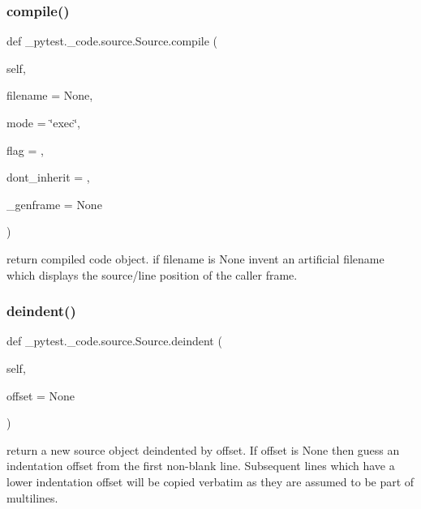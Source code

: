 \subsubsection{\texorpdfstring{compile()}{compile()}}
{\footnotesize\ttfamily def \+\_\+pytest.\+\_\+code.\+source.\+Source.\+compile (\begin{DoxyParamCaption}\item[{}]{self,  }\item[{}]{filename = {\ttfamily None},  }\item[{}]{mode = {\ttfamily \char`\"{}exec\char`\"{}},  }\item[{}]{flag = {},  }\item[{}]{dont\+\_\+inherit = {},  }\item[{}]{\+\_\+genframe = {\ttfamily None} }\end{DoxyParamCaption})}

\begin{DoxyVerb}return compiled code object. if filename is None
    invent an artificial filename which displays
    the source/line position of the caller frame.
\end{DoxyVerb}
 \mbox{\label{class__pytest_1_1__code_1_1source_1_1_source_a732b2d5134294e24d929b03050665c78}} 
\subsubsection{\texorpdfstring{deindent()}{deindent()}}
{\footnotesize\ttfamily def \+\_\+pytest.\+\_\+code.\+source.\+Source.\+deindent (\begin{DoxyParamCaption}\item[{}]{self,  }\item[{}]{offset = {\ttfamily None} }\end{DoxyParamCaption})}

\begin{DoxyVerb}return a new source object deindented by offset.
    If offset is None then guess an indentation offset from
    the first non-blank line.  Subsequent lines which have a
    lower indentation offset will be copied verbatim as
    they are assumed to be part of multilines.
\end{DoxyVerb}
 \mbox{\label{class__pytest_1_1__code_1_1source_1_1_source_a6e6af6b03c2af23ce350634fdb4770c1}} 
